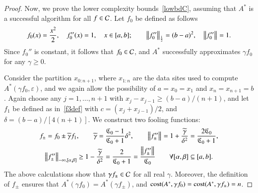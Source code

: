 \documentclass[review]{elsarticle}
\newcommand{\abstol}{\varepsilon}
\theoremstyle{definition}
\newcommand{\tgamma}{\widetilde{\gamma}}
\begin{document}
\begin{proof}
	Now, we prove the lower complexity bounds~\eqref{lowbdC}, assuming that $A^*$ is
	a successful algorithm for all $f \in \cc$. Let $f_0$ be defined as follows
	\begin{equation*}
	f_0(x) =\frac{x^2}{2}, \quad f_0''(x) = 1, \quad x \in [a,b]; \qquad \norm[\frac12]{f_0''}
	= (b -a)^2,  \quad \norm{f_0''} = 1.
	\end{equation*}
	Since $f_0''$ is constant, it follows that $f_0 \in \cc$,  and $A^*$ successfully
	approximates $\gamma f_0$ for any  $\gamma\ge0$.
	
	Consider the partition $x_{0:n+1}$, where $x_{1:n}$ are the data sites
	used to compute $A^*(\gamma f_0,\abstol)$, and we again allow the possibility of $a
	= x_0=x_1$
	and $x_n = x_{n+1} = b$.  Again choose any $j=1, \ldots, n+1$ with $x_j-x_{j-1}
	\ge (b-a)/(n+1)$, and let $f_1$ be defined as in~\eqref{f3def} with $c =
	(x_j+x_{j-1})/2$, and $\delta = (b-a)/[4(n+1)]$. We construct two fooling
	functions:
	\begin{gather*}
	f_{\pm} = f_0 \pm \tgamma f_1, \qquad \tgamma =\frac{\fC_0-1}{\fC_0+1}\delta^2,
	\qquad
	\norm{f''_{\pm}} = 1+\frac{\tgamma}{\delta^2} = \frac{2\fC_0}{\fC_0+1} , \\
\norm[-\infty,{[\alpha,\beta]}]{f''_{\pm}} \ge 1-\frac{\tgamma}{\delta^2} = \frac{2}{\fC_0+1}
= \frac{\norm{f''_{\pm}} }{\fC_0} \qquad \forall [\alpha,\beta] \subseteq [a,b].
	\end{gather*}
	The above calculations show that $\gamma f_{\pm} \in \cc$ for all real
	$\gamma$. Moreover, the definition of $f_{\pm}$ ensures that $A^*(\gamma f_0) =
	A^*(\gamma f_{\pm})$, and $\cost(A^*,\gamma f_0) = \cost(A^*,\gamma f_{\pm}) =
	n$.
	

\end{proof}
\end{document}
